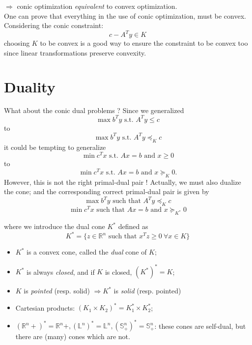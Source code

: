 $\Rightarrow$ conic optimization \emph{equivalent} to convex
optimization. \\

One can prove that everything in the use of conic optimization, must be convex. Considering the conic constraint: 
\begin{equation}
c-A^Ty \in K \nonumber 
\end{equation}
choosing $K$ to be convex is a good way to ensure the constraint to be convex too since linear transformations preserve convexity. \\

\section{Duality}
What about the conic dual problems ? Since we generalized
\[ \max b^T y \text{ s.t. } A^T y \leq c \] to
\[ \max b^T y \text{ s.t. } A^T y \preceq_K c \] it could be tempting to generalize
\[ \min c^T x \text{ s.t. } Ax = b \text{ and } x \geq 0 \]
to
\[ \min c^T x \text{ s.t. } Ax = b \text{ and } x \succeq_K 0 .\]
However, this is not the right primal-dual pair ! Actually, we must also dualize the cone; and the corresponding correct primal-dual pair is given by 
\vspace{0.3cm} \[ \max b^T y \text{ such that } A^T y \preceq_K c \]
\[ \min c^T x \text{ such that } Ax = b \text{ and } x \succeq_{K^*} 0 \]

\vspace{0.3cm}
where we introduce the dual cone $K^*$ defined as 
\[ K^* = \{ z \in \mathbb{R}^n \text{ such that }
x^T z \geq 0 \ \forall x \in K \} \]

\begin{itemize}
\item $K^*$ is a convex cone, called the \emph{dual} cone of $K$;
\item $K^*$ is always \emph{closed}, and if $K$ is closed, $(K^*)^* = K$; \item $K$ is \emph{pointed} (resp. 
   solid) $\Rightarrow K^*$ is \emph{solid} (resp. pointed) \item Cartesian products: $(K_1 \times K_2)^*
   = K_1^* \times K_2^*$;
\item $(\mathbb{R}^n+)^* = \mathbb{R}^n+, (\mathbb{L}^n)^* = \mathbb{L}^n, (\mathbb{S}_+^n)^* = \mathbb{S}_+^n$: these cones are self-dual, but there are (many) cones which are not.
\end{itemize}


% 
